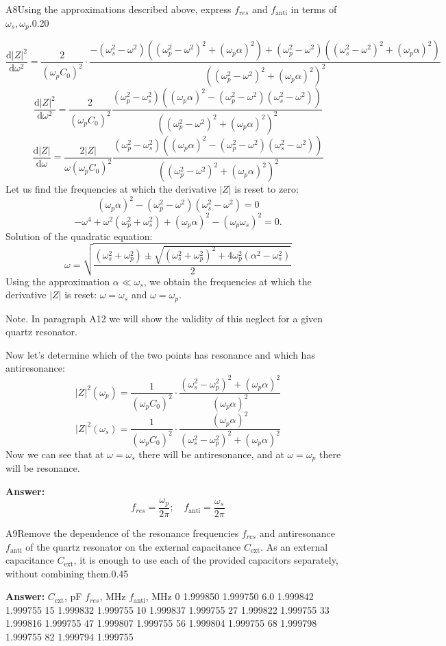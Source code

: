 \documentclass[11pt,a4paper]{article}
\begin{document}
\begin{solcard}{A8}{Using the approximations described above, express $f_{res}$ and $f_\text{anti}$ in terms of $\omega_s, \omega_p$.}{0.20}

\[\dfrac{\mathrm{d}|Z|^2}{\mathrm{d}\omega^2} = \dfrac{2}{(\omega_p C_0)^2}\cdot\dfrac{-(\omega_s^2-\omega^2)((\omega_p^2 - \omega^2)^2 + (\omega_p \alpha)^2) + (\omega_p^2-\omega^2)((\omega_s^2 - \omega^2)^2 + (\omega_p \alpha)^2)}{((\omega_p^2 - \omega^2)^2 + (\omega_p \alpha)^2)^2}\]\[\dfrac{\mathrm{d}|Z|^2}{\mathrm{d}\omega^2} = \dfrac{2}{(\omega_p C_0)^2 } \dfrac{(\omega_p^2 - \omega_s^2)((\omega_p \alpha)^2-(\omega_p^2 - \omega^2)(\omega_s^2 - \omega^2)) }{((\omega_p^2 - \omega^2)^2 + (\omega_p \alpha)^2)^2}\]\[\dfrac{\mathrm{d}|Z|}{\mathrm{d}\omega} = \dfrac{2|Z|}{\omega(\omega_p C_0)^2 } \dfrac{(\omega_p^2 - \omega_s^2)((\omega_p \alpha)^2-(\omega_p^2 - \omega^2)(\omega_s^2 - \omega^2)) }{((\omega_p^2 - \omega^2)^2 + (\omega_p \alpha)^2)^2}\]Let us find the frequencies at which the derivative $|Z|$ is reset to zero: \[(\omega_p \alpha)^2-(\omega_p^2 - \omega^2)(\omega_s^2 - \omega^2) = 0\]\[-\omega^4 + \omega^2 (\omega_p^2+\omega_s^2) + (\omega_p\alpha )^2-(\omega_p\omega_s)^2=0.\]Solution of the quadratic equation: \[\omega = \sqrt{\dfrac{(\omega_s^2+\omega_p^2)\pm \sqrt{(\omega_s^2+\omega_p^2)^2+4\omega_p^2 (\alpha^2 - \omega_s^2)} }{2}}\]Using the approximation $\alpha\ll\omega_s$, we obtain the frequencies at which the derivative $|Z|$ is reset: $\omega = \omega_s$ and $\omega =\omega_p$.


Note. In paragraph A12 we will show the validity of this neglect for a given quartz resonator.


Now let’s determine which of the two points has resonance and which has antiresonance: \[|Z|^2 (\omega_p) = \dfrac{1}{(\omega_p C_0)^2}\cdot\dfrac{(\omega_s^2 - \omega_p^2)^2 + (\omega_p \alpha)^2}{ (\omega_p \alpha)^2}\]\[|Z|^2 (\omega_s) = \dfrac{1}{(\omega_p C_0)^2}\cdot\dfrac{ (\omega_p \alpha)^2}{(\omega_s^2 - \omega_p^2)^2 + (\omega_p \alpha)^2}\]Now we can see that at $\omega = \omega_s$ there will be antiresonance, and at $\omega = \omega_p$ there will be resonance.

\par\smallskip\noindent\textbf{Answer:} \[f_{res} = \dfrac{\omega_p}{2\pi}; \quad f_\text{anti} = \dfrac{\omega_s}{2\pi}\]
\end{solcard}

\begin{solcard}{A9}{Remove the dependence of the resonance frequencies $f_{res}$ and antiresonance $f_\text{anti}$ of the quartz resonator on the external capacitance $C_{\text{ext}}$. As an external capacitance $C_{\text{ext}}$, it is enough to use each of the provided capacitors separately, without combining them.}{0.45}
\par\smallskip\noindent\textbf{Answer:} $C_{\text{ext}}$, pF $f_{res}$, MHz $f_\text{anti}$, MHz 0 1.999850 1.999750 6.0 1.999842 1.999755 15 1.999832 1.999755 10 1.999837 1.999755 27 1.999822 1.999755 33 1.999816 1.999755 47 1.999807 1.999755 56 1.999804 1.999755 68 1.999798 1.999755 82 1.999794 1.999755
\end{solcard}
\end{document}
